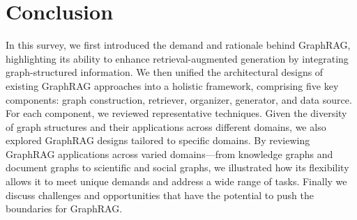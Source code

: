     
    





\section{Conclusion}\label{sec-conclusion}

In this survey, we first introduced the demand and rationale behind GraphRAG, highlighting its ability to enhance retrieval-augmented generation by integrating graph-structured information. We then unified the architectural designs of existing GraphRAG approaches into a holistic framework, comprising five key components: graph construction, retriever, organizer, generator, and data source. For each component, we reviewed representative techniques. Given the diversity of graph structures and their applications across different domains, we also explored GraphRAG designs tailored to specific domains. By reviewing GraphRAG applications across varied domains—from knowledge graphs and document graphs to scientific and social graphs, we illustrated how its flexibility allows it to meet unique demands and address a wide range of tasks. Finally we discuss challenges and opportunities that have the potential to push the boundaries for GraphRAG. 

